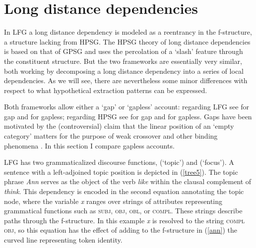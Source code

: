 %


\section{Long distance dependencies}
In LFG a long distance dependency is modeled as a reentrancy in the f-structure, a structure lacking from HPSG.  The HPSG theory of long distance dependencies is based on that of GPSG and uses the percolation of a `slash' feature through the constituent structure.  But the two frameworks are essentially very similar, both working by decomposing a long distance dependency into a series of local dependencies.  As we will see, there are nevertheless some minor differences with respect to what hypothetical extraction patterns can be expressed.  

Both frameworks allow either a `gap' or `gapless' account:  regarding LFG see \citet{BATW2015a} for gap and \citet{Dalrymple2001a-u} for gapless; regarding HPSG see \citet{ps2} for gap and \citet{SWB2003a} for gapless.  Gaps have been motivated by the (controversial) claim that the linear position of an `empty category' matters for the purpose of weak crossover and other binding phenomena 
\citep[chapter 9]{BATW2015a}.  In this section I compare gapless accounts.

LFG has two grammaticalized discourse functions,  (`topic') and  (`focus').  A sentence with a left-adjoined topic position is depicted in (\ref{tree5}).  The topic phrase \textit{Ann} serves as the object of the verb \textit{like} within the clausal complement of \textit{think}.  This dependency is encoded in the second equation annotating the topic node, where the variable \textit{x} ranges over strings of attributes representing grammatical functions such as \textsc{subj}, \textsc{obj}, \textsc{obl}, or \textsc{compl}.  These strings describe paths through the f-structure.   In this example \textit{x} is resolved to the string \textsc{compl obj}, so this equation has the effect of adding to the f-structure in (\ref{ann}) the curved line representing token identity.  

